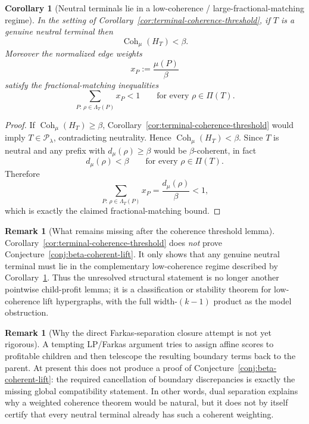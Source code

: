 \documentclass[11pt]{article}
\newtheorem{corollary}[theorem]{Corollary}
\theoremstyle{definition}
\newtheorem{remark}[theorem]{Remark}
\newcommand{\1}{\mathbf{1}}
\begin{document}
\begin{corollary}[Neutral terminals lie in a low-coherence / large-fractional-matching regime]\label{cor:neutral-low-coherence}
In the setting of Corollary~\ref{cor:terminal-coherence-threshold}, if $T$ is a genuine neutral terminal then
\[
\operatorname{Coh}_\mu(H_T)<\beta.
\]
Moreover the normalized edge weights
\[
x_P:=\frac{\mu(P)}{\beta}
\]
satisfy the fractional-matching inequalities
\[
\sum_{P:\,\rho\in \Lambda_T(P)} x_P<1
\qquad\text{for every }\rho\in \Pi(T).
\]
\end{corollary}

\begin{proof}
If $\operatorname{Coh}_\mu(H_T)\ge \beta$, Corollary~\ref{cor:terminal-coherence-threshold} would imply $T\in \mathcal P_\lambda$, contradicting neutrality. Hence $\operatorname{Coh}_\mu(H_T)<\beta$. Since $T$ is neutral and any prefix with $d_\mu(\rho)\ge \beta$ would be $\beta$-coherent, in fact
\[
d_\mu(\rho)<\beta
\qquad\text{for every }\rho\in \Pi(T).
\]
Therefore
\[
\sum_{P:\,\rho\in \Lambda_T(P)} x_P
=
\frac{d_\mu(\rho)}{\beta}
<1,
\]
which is exactly the claimed fractional-matching bound.
\end{proof}

\begin{remark}[What remains missing after the coherence threshold lemma]\label{rem:low-coherence-barrier}
Corollary~\ref{cor:terminal-coherence-threshold} does \emph{not} prove Conjecture~\ref{conj:beta-coherent-lift}. It only shows that any genuine neutral terminal must lie in the complementary low-coherence regime described by Corollary~\ref{cor:neutral-low-coherence}. Thus the unresolved structural statement is no longer another pointwise child-profit lemma; it is a classification or stability theorem for low-coherence lift hypergraphs, with the full width-$(k-1)$ product as the model obstruction.
\end{remark}

\begin{remark}[Why the direct Farkas-separation closure attempt is not yet rigorous]\label{rem:farkas-gap}
A tempting LP/Farkas argument tries to assign affine scores to profitable children and then telescope the resulting boundary terms back to the parent. At present this does not produce a proof of Conjecture~\ref{conj:beta-coherent-lift}: the required cancellation of boundary discrepancies is exactly the missing global compatibility statement. In other words, dual separation explains why a weighted coherence theorem would be natural, but it does not by itself certify that every neutral terminal already has such a coherent weighting.
\end{remark}
\end{document}
